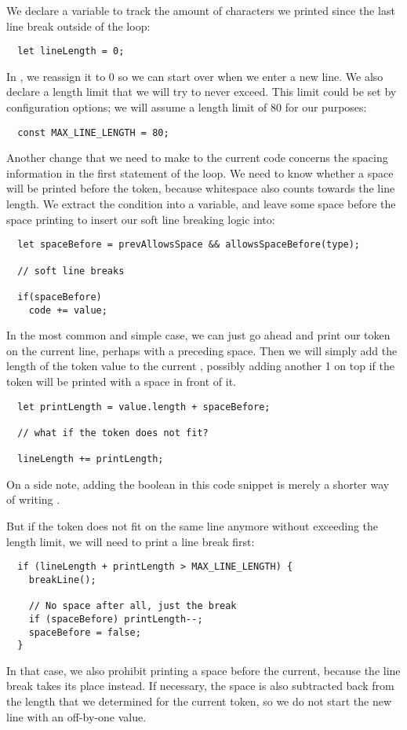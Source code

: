 We declare a variable to track the amount of characters
we printed since the last line break outside of the loop:
\begin{verbatim}
  let lineLength = 0;
\end{verbatim}
In , we reassign it to 0
so we can start over when we enter a new line.
We also declare a length limit that we will try to never exceed.
This limit could be set by configuration options;
we will assume a length limit of 80 for our purposes:
\begin{verbatim}
  const MAX_LINE_LENGTH = 80;
\end{verbatim}

Another change that we need to make to the current code
concerns the spacing information in the first statement of the loop.
We need to know whether a space will be printed before the token,
because whitespace also counts towards the line length.
We extract the condition into a variable,
and leave some space before the space printing
to insert our soft line breaking logic into:
\begin{verbatim}
  let spaceBefore = prevAllowsSpace && allowsSpaceBefore(type);

  // soft line breaks

  if(spaceBefore)
    code += value;
\end{verbatim}

In the most common and simple case,
we can just go ahead and print our token
on the current line,
perhaps with a preceding space.
Then we will simply add the length of the token value
to the current ,
possibly adding another 1 on top if
the token will be printed with a space in front of it.
\begin{verbatim}
  let printLength = value.length + spaceBefore;

  // what if the token does not fit?

  lineLength += printLength;
\end{verbatim}
On a side note, adding the boolean 
in this code snippet is merely a shorter way of
writing .

But if the token does not fit on the same line anymore
without exceeding the length limit,
we will need to print a line break first:
\begin{verbatim}
  if (lineLength + printLength > MAX_LINE_LENGTH) {
    breakLine();

    // No space after all, just the break
    if (spaceBefore) printLength--;
    spaceBefore = false;
  }
\end{verbatim}
In that case, we also prohibit printing a space before the current,
because the line break takes its place instead.
If necessary, the space is also subtracted back from the length
that we determined for the current token,
so we do not start the new line with an off-by-one  value.

